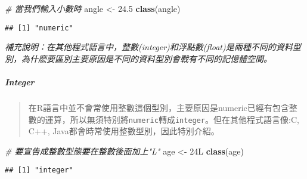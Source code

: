 \documentclass[]{article}
\newenvironment{Shaded}{\begin{snugshade}}{\end{snugshade}}
\newcommand{\KeywordTok}[1]{\textcolor[rgb]{0.13,0.29,0.53}{\textbf{{#1}}}}
\newcommand{\FloatTok}[1]{\textcolor[rgb]{0.00,0.00,0.81}{{#1}}}
\newcommand{\StringTok}[1]{\textcolor[rgb]{0.31,0.60,0.02}{{#1}}}
\newcommand{\CommentTok}[1]{\textcolor[rgb]{0.56,0.35,0.01}{\textit{{#1}}}}
\newcommand{\NormalTok}[1]{{#1}}
\let\oldsubparagraph\subparagraph
\renewcommand{\subparagraph}[1]{\oldsubparagraph{#1}\mbox{}}
\begin{document}
\begin{Shaded}
\begin{Highlighting}[]
\CommentTok{# 當我們輸入小數時}
\NormalTok{angle <-}\StringTok{ }\FloatTok{24.5}
\KeywordTok{class}\NormalTok{(angle)}
\end{Highlighting}
\end{Shaded}

\begin{verbatim}
## [1] "numeric"
\end{verbatim}

\emph{補充說明：在其他程式語言中，整數(integer)和浮點數(float)是兩種不同的資料型別，為什麽要區別主要原因是不同的資料型別會戰有不同的記憶體空間。}

\subparagraph{Integer}\label{integer}

\begin{quote}
在R語言中並不會常使用整數這個型別，主要原因是numeric已經有包含整數的運算，所以無須特別將\texttt{numeric}轉成\texttt{integer}。但在其他程式語言像:C,
C++, Java都會時常使用整數型別，因此特別介紹。
\end{quote}

\begin{Shaded}
\begin{Highlighting}[]
\CommentTok{# 要宣告成整數型態要在整數後面加上"L"}
\NormalTok{age <-}\StringTok{ }\NormalTok{24L}
\KeywordTok{class}\NormalTok{(age)}
\end{Highlighting}
\end{Shaded}

\begin{verbatim}
## [1] "integer"
\end{verbatim}
\end{document}
